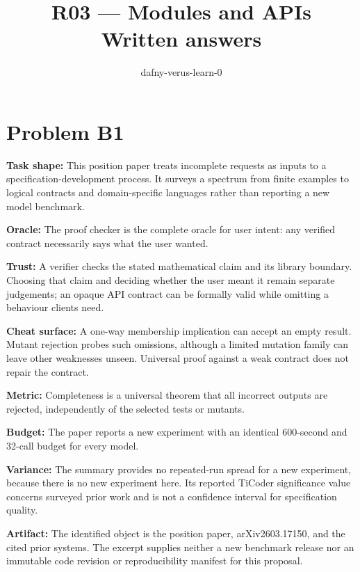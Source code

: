 \documentclass[11pt]{article}
\title{R03 --- Modules and APIs \\ \large Written answers}
\author{dafny-verus-learn-0}
\date{}
\begin{document}
\maketitle
\section*{Problem B1}\label{ans:B1}
\begin{answer}
\textbf{Task shape:} This position paper treats incomplete requests as inputs to a specification-development process. It surveys a spectrum from finite examples to logical contracts and domain-specific languages rather than reporting a new model benchmark.

\textbf{Oracle:} The proof checker is the complete oracle for user intent: any verified contract necessarily says what the user wanted.

\textbf{Trust:} A verifier checks the stated mathematical claim and its library boundary. Choosing that claim and deciding whether the user meant it remain separate judgements; an opaque API contract can be formally valid while omitting a behaviour clients need.

\textbf{Cheat surface:} A one-way membership implication can accept an empty result. Mutant rejection probes such omissions, although a limited mutation family can leave other weaknesses unseen. Universal proof against a weak contract does not repair the contract.

\textbf{Metric:} Completeness is a universal theorem that all incorrect outputs are rejected, independently of the selected tests or mutants.

\textbf{Budget:} The paper reports a new experiment with an identical 600-second and 32-call budget for every model.

\textbf{Variance:} The summary provides no repeated-run spread for a new experiment, because there is no new experiment here. Its reported TiCoder significance value concerns surveyed prior work and is not a confidence interval for specification quality.

\textbf{Artifact:} The identified object is the position paper, arXiv2603.17150, and the cited prior systems. The excerpt supplies neither a new benchmark release nor an immutable code revision or reproducibility manifest for this proposal.
\end{answer}
\end{document}
